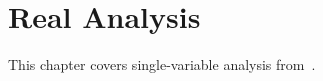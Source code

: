 %
%
%
\chapter{Real Analysis}
This chapter covers single-variable analysis from~\cite{rudin76}.








